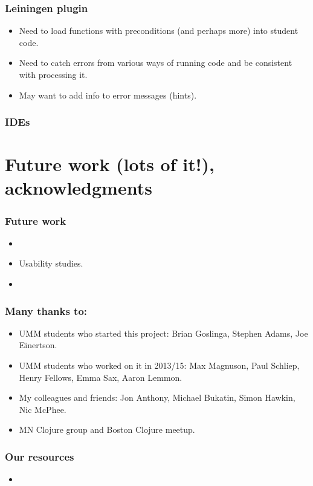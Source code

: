 \documentclass{beamer}
\begin{document}
\begin{frame}
   \frametitle{Leiningen plugin}
\begin{itemize}
\item Need to load functions with preconditions (and perhaps more) into student code. 
\item Need to catch errors from various ways of running code and be consistent with processing it.
\item May want to add info to error messages (hints). 
\end{itemize}
\end{frame}

\begin{frame}
   \frametitle{IDEs}

\end{frame}

\section{Future work (lots of it!), acknowledgments}

\begin{frame}
   \frametitle{Future work}
\begin{itemize}
\item 
\item Usability studies. 
\item 
\end{itemize}
\end{frame}

\begin{frame}
   \frametitle{Many thanks to:}
\begin{itemize}
\item UMM students who started this project: Brian Goslinga, Stephen Adams, Joe Einertson. 
\item UMM students who worked on it in 2013/15: Max Magnuson, Paul Schliep, Henry Fellows, Emma Sax, Aaron Lemmon. 
\item My colleagues and friends: Jon Anthony, Michael Bukatin, Simon Hawkin, Nic McPhee. 
\item MN Clojure group and Boston Clojure meetup. 
\end{itemize}
\end{frame}

\begin{frame}
   \frametitle{Our resources}
\begin{itemize}
\item 
\end{itemize}
\end{frame}
\end{document}
